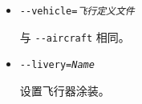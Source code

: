 \begin{itemize}
{\begin{itemize}
\item{\texttt{-$ $-vehicle={\it 飞行定义文件}}}

  与 \texttt{-$ $-aircraft} 相同。

  \item{\texttt{-$ $-livery={\it Name}}}

  设置飞行器涂装。

  \end{itemize}
}
\fi












\end{itemize}
